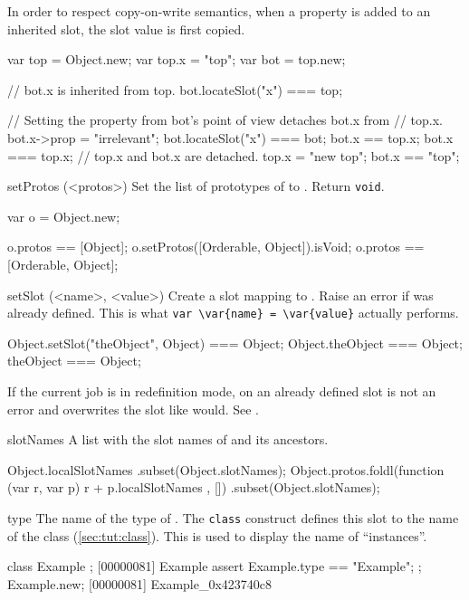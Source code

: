 \begin{urbiscriptapi}
  In order to respect copy-on-write semantics, when a property is added to
  an inherited slot, the slot value is first copied.

\begin{urbiassert}
var top = Object.new;
var top.x = "top";
var bot = top.new;

// bot.x is inherited from top.
bot.locateSlot("x") === top;

// Setting the property from bot's point of view detaches bot.x from
// top.x.
bot.x->prop = "irrelevant";
bot.locateSlot("x") === bot;
bot.x  == top.x;
bot.x === top.x;
// top.x and bot.x are detached.
top.x  = "new top";
bot.x == "top";
\end{urbiassert}


\item[setProtos](<protos>)%
  Set the list of prototypes of \this to .  Return
  \lstinline|void|.
\begin{urbiassert}
var o = Object.new;

o.protos == [Object];
o.setProtos([Orderable, Object]).isVoid;
o.protos == [Orderable, Object];
\end{urbiassert}


\item[setSlot](<name>, <value>)%
  Create a slot  mapping to . Raise an error if
   was already defined.  This is what
  \lstinline|var \var{name} = \var{value}| actually performs.
\begin{urbiassert}
Object.setSlot("theObject", Object) === Object;
Object.theObject === Object;
theObject === Object;
\end{urbiassert}

If the current job is in redefinition mode,  on an already
defined slot is not an error and overwrites the slot like
 would. See .


\item[slotNames]%
  A list with the slot names of \this and its ancestors.
\begin{urbiassert}
Object.localSlotNames
  .subset(Object.slotNames);
Object.protos.foldl(function (var r, var p) { r + p.localSlotNames },
                    [])
  .subset(Object.slotNames);
\end{urbiassert}


\item[type]%
  The name of the type of \this.  The \lstinline|class|
  construct defines this slot to the name of the class
  (\autoref{sec:tut:class}).  This is used to display the name of
  ``instances''.
\begin{urbiscript}
class Example {};
[00000081] Example
assert
{
  Example.type == "Example";
};
Example.new;
[00000081] Example_0x423740c8
\end{urbiscript}



\end{urbiscriptapi}
